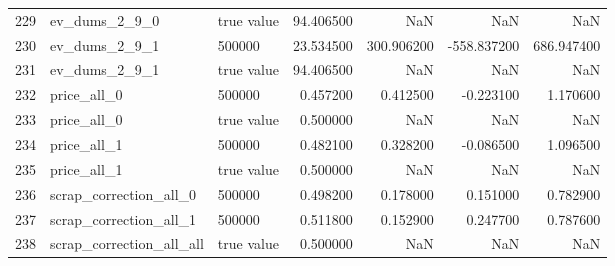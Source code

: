 \begin{tabular}{lllrrrr}
229 & ev_dums_2_9_0 & true value & 94.406500 & NaN & NaN & NaN \\
230 & ev_dums_2_9_1 & 500000 & 23.534500 & 300.906200 & -558.837200 & 686.947400 \\
231 & ev_dums_2_9_1 & true value & 94.406500 & NaN & NaN & NaN \\
232 & price_all_0 & 500000 & 0.457200 & 0.412500 & -0.223100 & 1.170600 \\
233 & price_all_0 & true value & 0.500000 & NaN & NaN & NaN \\
234 & price_all_1 & 500000 & 0.482100 & 0.328200 & -0.086500 & 1.096500 \\
235 & price_all_1 & true value & 0.500000 & NaN & NaN & NaN \\
236 & scrap_correction_all_0 & 500000 & 0.498200 & 0.178000 & 0.151000 & 0.782900 \\
237 & scrap_correction_all_1 & 500000 & 0.511800 & 0.152900 & 0.247700 & 0.787600 \\
238 & scrap_correction_all_all & true value & 0.500000 & NaN & NaN & NaN \\
\bottomrule
\end{tabular}

